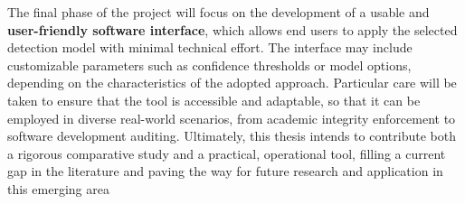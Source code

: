 The final phase of the project will focus on 
the development of a usable and \textbf{user-friendly 
software interface}, which allows end users 
to apply the selected detection model with 
minimal technical effort. The interface may 
include customizable parameters such as 
confidence thresholds or model options, 
depending on the characteristics of the 
adopted approach. Particular care will be 
taken to ensure that the tool is accessible 
and adaptable, so that it can be employed in 
diverse real-world scenarios, from academic 
integrity enforcement to software development auditing.
Ultimately, this thesis intends to contribute 
both a rigorous comparative study and a 
practical, operational tool, filling a 
current gap in the literature and paving 
the way for future research and application 
in this emerging area
